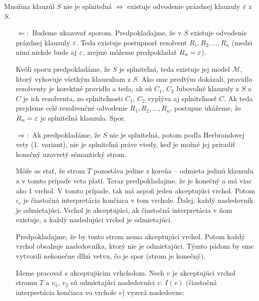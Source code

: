 \begin{veta} 
    Množina klauzúl $S$ nie je splniteľná $\iff$ 
    existuje odvodenie prázdnej klauzuly $\varepsilon$ z $S$.
\end{veta}

\begin{dokaz}
\noindent
    \begin{itemize}
    \item[$\Leftarrow:$]
        Budeme ukazovať sporom.
        Predpokladajme, že v $S$ existuje odvodenie prázdnej klauzuly $\varepsilon$. 
        Teda existuje postupnosť rezolvent $R_1, R_2, \dots, R_n$ 
        (medzi nimi niekde bude aj $\varepsilon$, zrejme môžeme predpokladať
        $R_n = \varepsilon$).

        Kvôli sporu predpokladáme, že $S$ je splniteľná, 
        teda existuje jej model $\mathcal{M}$, ktorý
        vyhovuje všetkým klauzuliam z $S$. Ako sme predtým dokázali,
        pravidlo rezolventy je korektné pravidlo a teda, ak sú
        $C_1$, $C_2$ ľubovoľné klauzuly z $S$ a $C$ je ich rezolventa,
        zo splniteľnosti $C_1$, $C_2$ vyplýva aj splniteľnosť $C$.
        Ak teda prejdeme celé rezolvenčné odvodenie $R_1,R_2,\dots,R_n$,
        postupne ukážeme, že $R_n=\varepsilon$ je splniteľná klauzula. Spor.

\startFIXME
    \item[$\Rightarrow:$] Ak
        predpokladáme, že $S$ nie je splniteľná, potom podľa Herbrandovej vety (1.
        variant), nie je splniteľná práve vtedy, keď je možné jej priradiť konečný
        uzavretý sémantický strom. 

        \par Môže as stať, že strom $T$ pozostáva jedine z koreňa -- odmieta jedinú
        klauzulu a v tomto prípade veta platí. Teraz predpokladajme, že je konečný a má
        viac ako 1 vrchol. V tomto prípade, tak má aspoň jeden akceptujúci vrchol. Potom
        $i_v$ je čiastočná interpretácia končiaca v tom vrchole. Ďalej, každý
        nasledovník je odmietajúci. Vrchol je akceptujúci, ak čiastočná interpretácia v
        ňom existuje, a každý nasledujúci vrchol je odmietajúci.

        \par Predpokladajme, že by tento strom nema akceptujúci vrchol. Potom každý
        vrchol obsahuje nasledovníka, ktorý nie je odmietajúci. Týmto pádom by sme
        vytvorili nekonečne dlhú vetvu, čo je spor (strom je konečný).

        \par Ideme pracovať s akceptujúcim vrhcholom. Nech $v$ je akceptujúci vrchol
        stromu $T$ a $v_1$, $v_2$ sú odmietajúci nasledovníci $v$. $I(v)$ (čiastočná
        interpretácia končiaca vo vrchole $v$) vyzerá nasledovne:


\end{itemize}
\end{dokaz}
